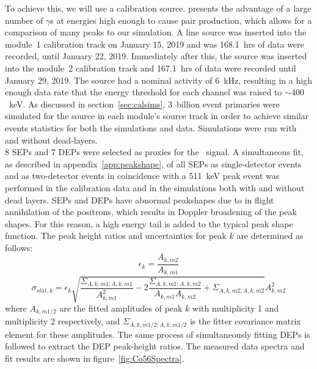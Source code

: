 \documentclass[/main.tex]{subfiles}
\begin{document}
To achieve this, we will use a  calibration source.
 presents the advantage of a large number of $\gamma$s at energies high enough to cause pair production, which allows for a comparison of many peaks to our simulation.
A  line source was inserted into the module~1 calibration track on January 15, 2019 and was 168.1~hrs of data were recorded, until January 22, 2019.
Immediately after this, the source was inserted into the module~2 calibration track and 167.1~hrs of data were recorded until January 29, 2019.
The source had a nominal activity of 6~kHz, resulting in a high enough data rate that the energy threshold for each channel was raised to $\sim400$~keV.
As discussed in section~\ref{sec:calsims}, 3~billion event primaries were simulated for the  source in each module's source track in order to achieve similar events statistics for both the simulations and data.
Simulations were run with and without dead-layers.
\\
8 SEPs and 7 DEPs were selected as proxies for the \bbes\ signal.
A simultaneous fit, as described in appendix~\ref{app:peakshape}, of all SEPs as single-detector events and as two-detector events in coincidence with a 511~keV peak event was performed in the calibration data and in the simulations both with and without dead layers.
SEPs and DEPs have abnormal peakshapes due to in flight annihilation of the positrons, which results in Doppler broadening of the peak shapes.
For this reason, a high energy tail is added to the typical peak shape function.
The peak height ratios and uncertainties for peak $k$ are determined as follows:
\begin{equation}
  \epsilon_k=\frac{A_{k,m2}}{A_{k,m1}}
\end{equation}
\begin{equation}
  \sigma_{stat, k}=\epsilon_k \sqrt{\frac{\Sigma_{A,k,m1;A,k,m1}}{A_{k,m1}^2}-2\frac{\Sigma_{A,k,m1;A,k,m2}}{A_{k,m1}A_{k,m2}}+\Sigma_{A,k,m2;A,k,m2}}{A_{k,m2}^2}
\end{equation}
where $A_{k,m1/2}$ are the fitted amplitudes of peak $k$ with multiplicity 1 and multiplicity 2 respectively, and $\Sigma_{A,k,m1/2;A,k,m1/2}$ is the fitter covariance matrix element for these amplitudes.
The same process of simultaneously fitting DEPs is followed to extract the DEP peak-height ratios.
The measured data spectra and fit results are shown in figure~\ref{fig:Co56Spectra}.
\\
\end{document}
